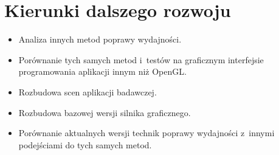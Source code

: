 \documentclass[a4paper,twoside,12pt]{book}
\newcounter{stronyPozaNumeracja}
\begin{document}
\section{Kierunki dalszego rozwoju}
\begin{itemize}
    \item Analiza innych metod poprawy wydajności.
    \item Porównanie tych samych metod i~testów na graficznym interfejsie programowania aplikacji innym niż OpenGL.
    \item Rozbudowa scen aplikacji badawczej.
    \item Rozbudowa bazowej wersji silnika graficznego.
    \item Porównanie aktualnych wersji technik poprawy wydajności z~innymi podejściami do tych samych metod.
\end{itemize}



\backmatter
{}
\setcounter{page}{\value{stronyPozaNumeracja}}

\pagestyle{tylkoNumeryStron}





\end{document}
